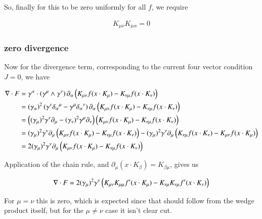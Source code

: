 So, finally for this to be zero uniformly for all $f$, we require

\begin{align*}
K_{\mu\nu} K_{\mu\alpha} = 0 
\end{align*}

\subsubsection{zero divergence }

Now for the divergence term, corresponding to the current four vector condition $J = 0$, we have

\begin{align*}
\nabla \cdot F 
&= \gamma^\alpha \cdot
\left(\gamma^\mu \wedge \gamma^\nu\right) \partial_\alpha \left( K_{\mu\nu} f( x \cdot K_\mu ) -K_{\nu\mu} f( x \cdot K_\nu ) \right) \\
&= 
(\gamma_\alpha)^2 
\left( \gamma^\nu {\delta_\alpha}^\mu -\gamma^\mu {\delta_\alpha}^\nu \right)
\partial_\alpha \left( K_{\mu\nu} f( x \cdot K_\mu ) -K_{\nu\mu} f( x \cdot K_\nu ) \right) \\
&= 
\left(
(\gamma_\mu)^2 \gamma^\nu \partial_\mu 
-(\gamma_\nu)^2 \gamma^\mu \partial_\nu 
\right)
\left( K_{\mu\nu} f( x \cdot K_\mu ) -K_{\nu\mu} f( x \cdot K_\nu ) \right) \\
&= 
(\gamma_\mu)^2 \gamma^\nu \partial_\mu \left( K_{\mu\nu} f( x \cdot K_\mu ) -K_{\nu\mu} f( x \cdot K_\nu ) \right) 
-(\gamma_\mu)^2 \gamma^\nu \partial_\mu \left( K_{\nu\mu} f( x \cdot K_\nu ) -K_{\mu\nu} f( x \cdot K_\mu ) \right) \\
&= 2 (\gamma_\mu)^2 \gamma^\nu \partial_\mu \left( K_{\mu\nu} f( x \cdot K_\mu ) -K_{\nu\mu} f( x \cdot K_\nu ) \right) \\
\end{align*}

Application of the chain rule, and $\partial_\mu ( x \cdot K_\beta ) = K_{\beta\mu}$, gives us

\begin{align*}
\nabla \cdot F 
&= 2 (\gamma_\mu)^2 \gamma^\nu \left( K_{\mu\nu} K_{\mu\mu} f'( x \cdot K_\mu ) -K_{\nu\mu} K_{\nu\mu} f'( x \cdot K_\nu ) \right) \\
\end{align*}

For $\mu = \nu$ this is zero, which is expected since that should follow from the wedge product itself, but for the $\mu \ne \nu$
case it isn't clear cut.

